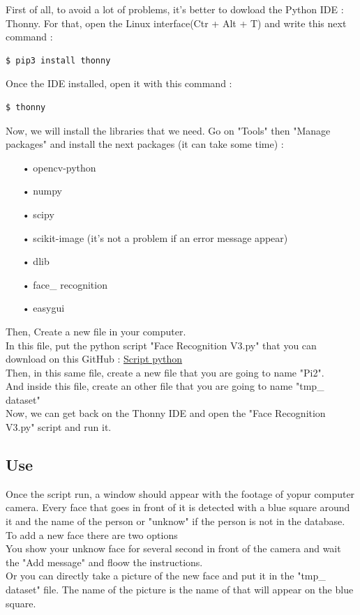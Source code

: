 \documentclass[12pt, oneside]{article}
\begin{document}
First of all, to avoid a lot of problems, it's better to dowload the Python IDE : Thonny. For that, open the Linux interface(Ctr + Alt + T) and write this next command :
\begin{lstlisting}[language=bash]
  $ pip3 install thonny
\end{lstlisting}

Once the IDE installed, open it with this command :
\begin{lstlisting}[language=bash]
  $ thonny
\end{lstlisting}

Now, we will install the libraries that we need. Go on "Tools" then "Manage packages" and install the next packages (it can take some time) :
\begin{itemize}
	\item[•] opencv-python
	\item[•] numpy
	\item[•] scipy
	\item[•] scikit-image (it's not a problem if an error message appear)
 	\item[•] dlib
	\item[•] face\_ recognition
	\item[•] easygui
\end{itemize}

Then, Create a new file in your computer. \\
In this file, put the python script "Face Recognition V3.py" that you can download on this GitHub : \href{https://github.com/MadScientistHK/Pi2_Face_Recognition}{Script python}\\
Then, in this same file, create a new file that you are going to name "Pi2".\\
And inside this file, create an other file that you are going to name "tmp\_ dataset"
\vspace{1cm}
\\
Now, we can get back on the Thonny IDE and open the "Face Recognition V3.py" script and run it.


\subsection{Use}
Once the script run, a window should appear with the footage of yopur computer camera. Every face that goes in front of it is detected with a blue square around it and the name of the person or "unknow" if the person is not in the database.\\
To add a new face there are two options \\
You show your unknow face for several second in front of the camera and wait the "Add message" and floow the instructions.\\
Or you can directly take a picture of the new face and put it in the "tmp\_ dataset" file. The name of the picture is the name of that will appear on the blue square.
\end{document}
